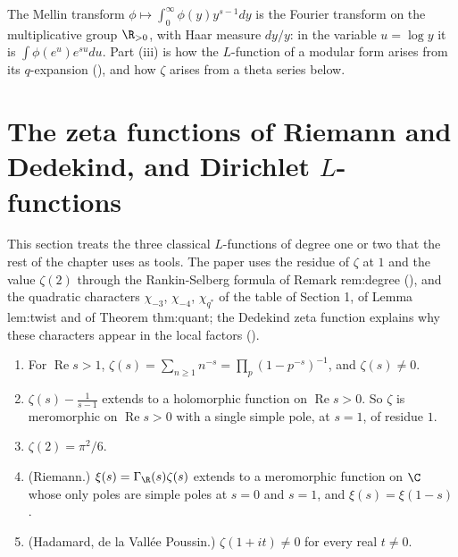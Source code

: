 The Mellin transform $\phi\mapsto\int_0^\infty\phi(y)y^{s-1}dy$ is the Fourier transform on the multiplicative group $\R_{>0}$, with Haar measure $dy/y$: in the variable
$u=\log y$ it is $\int\phi(e^u)e^{su}du$. Part (iii) is how the $L$-function of a modular form arises from its $q$-expansion (), and how
$\zeta$ arises from a theta series below.

\section[Zeta, Dirichlet and Dedekind]{The zeta functions of Riemann and Dedekind, and Dirichlet \texorpdfstring{$L$}{L}-functions}\label{sec:lfunctions:zeta}

This section treats the three classical $L$-functions of degree one or two that the rest of the chapter uses as tools. The paper uses the residue of
$\zeta$ at $1$ and the value $\zeta(2)$ through the Rankin-Selberg formula of Remark rem:degree (), and the quadratic characters
$\chi_{-3}$, $\chi_{-4}$, $\chi_{q^*}$ of the table of Section 1, of Lemma lem:twist and of Theorem thm:quant; the Dedekind zeta function explains why these
characters appear in the local factors ().

\begin{theorem}\label{thm:lfunctions:zeta}
\begin{enumerate}[label=(\roman*)]
\item For $\operatorname{Re}s>1$, $\zeta(s)=\sum_{n\ge1}n^{-s}=\prod_p(1-p^{-s})^{-1}$, and $\zeta(s)\ne0$.
\item $\zeta(s)-\frac1{s-1}$ extends to a holomorphic function on $\operatorname{Re}s>0$. So $\zeta$ is meromorphic on $\operatorname{Re}s>0$ with a single simple pole, at $s=1$, of
residue $1$.
\item $\zeta(2)=\pi^2/6$.
\item (Riemann.) $\xi(s)=\Gamma_\R(s)\zeta(s)$ extends to a meromorphic function on $\C$ whose only poles are simple poles at $s=0$ and $s=1$, and $\xi(s)=\xi(1-s)$.
\item (Hadamard, de la Vall\'ee Poussin.) $\zeta(1+it)\ne0$ for every real $t\ne0$.
\end{enumerate}
\end{theorem}

